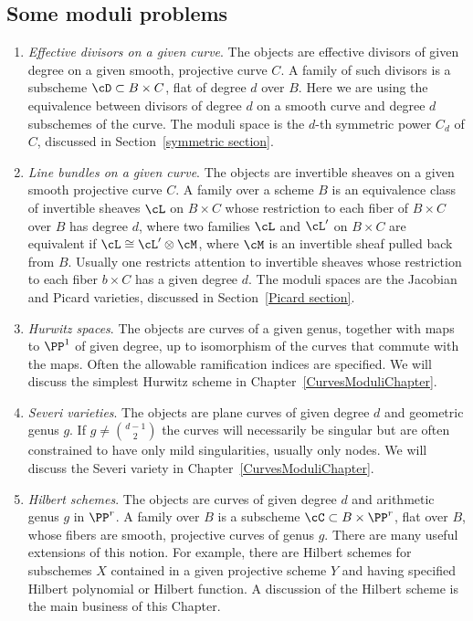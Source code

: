 \subsection{Some moduli problems}

\begin{enumerate}\label{list of moduli problems}

\item \emph{Effective divisors on a given curve}. The objects are effective divisors of given degree on a given smooth, projective curve $C$. A family of such divisors is a subscheme $\cD \subset B \times C$, flat of degree $d$ over $B$. 
Here we are using
the equivalence between divisors of degree $d$ on a smooth curve and degree $d$ subschemes of the curve. The moduli space is the $d$-th symmetric power $C_d$ of $C$, discussed in Section~\ref{symmetric section}.

\item \emph{Line bundles on a given curve}. The objects are invertible sheaves on a given smooth projective curve $C$. A family over a scheme $B$ is an equivalence class of invertible sheaves $\cL$ on $B \times C$ whose restriction to each fiber of $B \times C$ over $B$ has degree $d$, where two families $\cL$ and $\cL'$ on $B \times C$ are equivalent if $\cL\cong \cL' \otimes \cM$, where $\cM$ is  an invertible sheaf pulled back from $B$. Usually one restricts attention to invertible sheaves 
whose restriction to each fiber $b\times C$ has a given degree $d$.
The moduli spaces are the Jacobian and Picard varieties, discussed in Section~\ref{Picard section}.

\item \emph{Hurwitz spaces}. The objects are curves of a given genus, together with maps to $\PP^1$ of given degree, up to isomorphism of the curves that commute with the maps. Often the allowable ramification indices are specified. We will discuss the simplest Hurwitz scheme in Chapter~\ref{CurvesModuliChapter}.

\item \emph{Severi varieties}. The objects are plane curves
of given degree $d$ and geometric genus $g$. If $g \neq {d-1\choose 2}$
the curves will necessarily be singular but are often
constrained to have only mild singularities, usually only nodes. We will discuss the Severi variety in Chapter~\ref{CurvesModuliChapter}.

\item \emph{Hilbert schemes}. The objects are curves of given degree $d$ and arithmetic genus $g$ in $\PP^r$.  A family over $B$ is a subscheme $\cC \subset B \times \PP^r$, flat over $B$,  whose fibers are smooth, projective curves of genus $g$. There are many useful extensions of this notion. For example, there are Hilbert schemes
for subschemes $X$ contained in a given projective scheme $Y$ and having specified Hilbert polynomial or Hilbert function. 
A discussion of the Hilbert scheme is the main business of this Chapter.


\end{enumerate}
